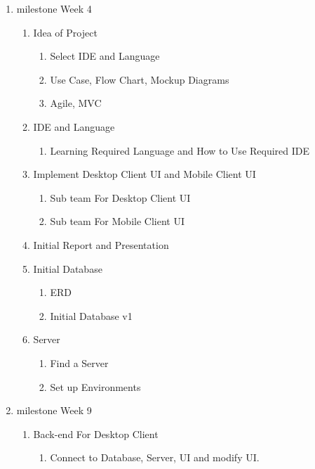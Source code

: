 \documentclass{article}
\begin{document}
	\begin{enumerate}[Level 1:]
		\item milestone Week 4
		
		\begin{enumerate}[1]
			\item Idea of Project
			\begin{enumerate}[a]
				\item Select IDE and Language
				\item Use Case, Flow Chart, Mockup Diagrams
				\item Agile, MVC
			\end{enumerate}
			\item IDE and Language
			\begin{enumerate}[a]
				\item Learning Required Language and How to Use Required IDE
			\end{enumerate}
			\item Implement Desktop Client UI and Mobile Client UI
			\begin{enumerate}[a]
				\item Sub team For Desktop Client UI
				\item Sub team For Mobile Client UI
			\end{enumerate}
			\item Initial Report and Presentation
			\item Initial Database
			\begin{enumerate}[a]
				\item ERD 
				\item Initial Database v1
			\end{enumerate}
			\item Server
			\begin{enumerate}[a]
				\item Find a Server
				\item Set up Environments
			\end{enumerate}
		\end{enumerate}
		
		\item milestone Week 9
		
		\begin{enumerate}[1]
			\item Back-end For Desktop Client
			\begin{enumerate}[a]
				\item Connect to Database, Server, UI and modify UI.
			\end{enumerate}
			

\end{enumerate}
\end{enumerate}
\end{document}
